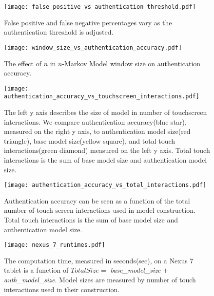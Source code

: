 \begin{figure}
\centering
\texttt{[image: false\_positive\_vs\_authentication\_threshold.pdf]}
\caption{False positive and false negative percentages vary as the authentication threshold is adjusted.}
\label{fig:threshold_vs_percentages}
\end{figure}

\begin{figure}
\centering
\texttt{[image: window\_size\_vs\_authentication\_accuracy.pdf]}
\caption{The effect of $n$ in $n$-Markov Model window size on authentication accuracy.}
\label{fig:window_size_vs_authentication_accuracy}
\end{figure}

\begin{figure}
\centering
\texttt{[image: authentication\_accuracy\_vs\_touchscreen\_interactions.pdf]}
\caption{
The left y axis describes the size of model
in number of touchscreen interactions.
We compare
authentication accuracy(blue star), measured on the right y axis, 
to authentication model size(red triangle),
base model size(yellow square),
and total touch interactions(green diamond)
measured on the left y axis.
Total touch interactions is the sum of
base model size and authentication model size.
}
\label{fig:authentication_accuracy}
\end{figure}

\begin{figure}
\centering
\texttt{[image: authentication\_accuracy\_vs\_total\_interactions.pdf]}
\caption{
Authentication accuracy can be seen as
a function of
the total number of touch screen interactions
used in model construction.
Total touch interactions is the sum of
base model size and authentication model size.
}
\label{fig:total_touches_vs_authentication_accuracy}
\end{figure}

\begin{figure}
\centering
\texttt{[image: nexus\_7\_runtimes.pdf]}
\caption{
The computation time, measured in seconds(sec), on a Nexus 7 tablet is
a function of
$Total Size =$ {\it base\_model\_size} $+$ {\it auth\_model\_size}.
Model sizes are measured by number of touch interactions used in their construction.
}
\label{fig:nexus_total_size_time}
\end{figure}



